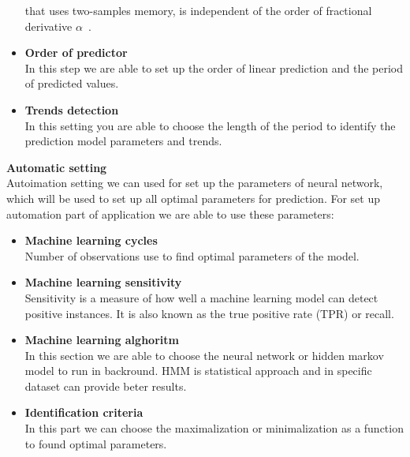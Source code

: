 \begin{itemize}
            that uses two-samples memory, is independent of the order of fractional derivative $\alpha$~\cite{DESPOTOVIC2018158}.
            \item \textbf{Order of predictor}\\
            In this step we are able to set up the order of linear prediction and the
            period of predicted values.
            \item \textbf{Trends detection}\\
            In this setting you are able to choose the length of the period to 
            identify the prediction model parameters and trends.
        \end{itemize}
        \noindent
        \textbf{Automatic setting}\\
        Autoimation setting we can used for set up the parameters of neural network,
        which will be used to set up all optimal parameters for prediction. For set up
        automation part of application we are able to use these parameters:\\
        \begin{itemize}
            \item \textbf{Machine learning cycles}\\
            Number of observations use to find optimal parameters of the model.
            \item \textbf{Machine learning sensitivity}\\
            Sensitivity is a measure of how well a machine learning model can
            detect positive instances. It is also known as the true positive rate
            (TPR) or recall.
            \item \textbf{Machine learning alghoritm}\\
            In this section we are able to choose the neural network or hidden markov model
            to run in backround. HMM is statistical approach and in specific dataset can provide
            beter results.
            \item \textbf{Identification criteria}\\
            In this part we can choose the maximalization or minimalization as a function
            to found optimal parameters.
        \end{itemize}

